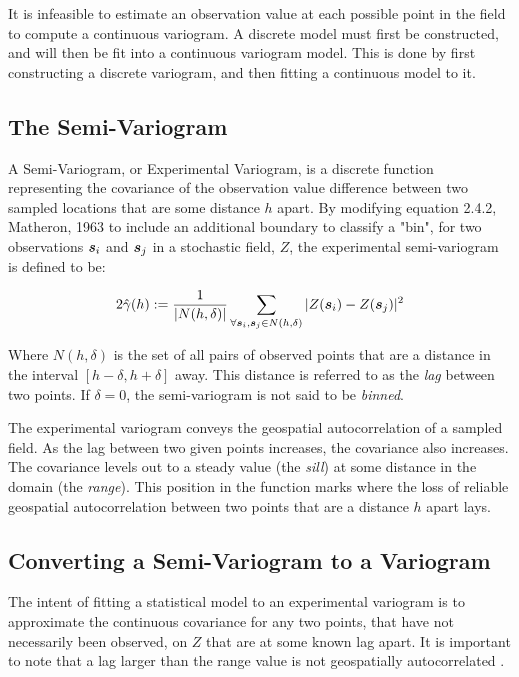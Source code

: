 It is infeasible to estimate an observation value at each possible point in the field to compute a continuous variogram. A discrete model must first be constructed, and will then be fit into a continuous variogram model. This is done by first constructing a discrete variogram, and then fitting a continuous model to it.

\subsection{The Semi-Variogram}
A Semi-Variogram, or Experimental Variogram, is a discrete function representing the covariance of the observation value difference between two sampled locations that are some distance $h$ apart. By modifying equation 2.4.2, Matheron, 1963 \cite{matheron:geostat} to include an additional boundary to classify a "bin", for two observations ${\it{\boldsymbol{s}}}_{i}$ and ${\it{\boldsymbol{s}}}_{j}$ in a stochastic field, $Z$, the experimental semi-variogram is defined to be:

\begin{equation} 
    \label{eq:exp_var}
    2\hat{\gamma}(h) := \frac{1}{|N(h,\delta)|}\sum\limits_{\forall \vect{s}_i,\vect{s}_j \in N(h, \delta)}|Z(\vect{s}_i) - Z(\vect{s}_j)|^2 %
\end{equation}

Where $N(h,\delta)$ is the set of all pairs of observed points that are a distance in the interval $[h-\delta, h+\delta]$ away. This distance is referred to as the \textit{lag} between two points. If $\delta = 0$, the semi-variogram is not said to be \textit{binned}.

The experimental variogram conveys the geospatial autocorrelation of a sampled field. As the lag between two given points increases, the covariance also increases. The covariance levels out to a steady value (the \textit{sill}) at some distance in the domain (the \textit{range}). This position in the function marks where the loss of reliable geospatial autocorrelation between two points that are a distance $h$ apart lays.

\subsection{Converting a Semi-Variogram to a Variogram} \label{sec:semitovar}
The intent of fitting a statistical model to an experimental variogram is to approximate the continuous covariance for any two points, that have not necessarily been observed, on $Z$ that are at some known lag apart. It is important to note that a lag larger than the range value is not geospatially autocorrelated \cite{felus:srn}. 

